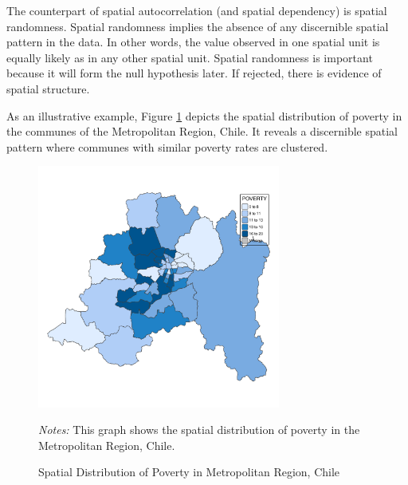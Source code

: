 \documentclass[english,12pt]{book}\usepackage[]{graphicx}\usepackage[]{xcolor}
\newenvironment{knitrout}{}{} %
\begin{document}
The counterpart of spatial autocorrelation (and spatial dependency) is spatial randomness. Spatial randomness implies the absence of any discernible spatial pattern in the data. In other words, the value observed in one spatial unit is equally likely as in any other spatial unit. Spatial randomness is important because it will form the null hypothesis later. If rejected, there is evidence of spatial structure.

As an illustrative example, Figure \ref{fig:MR} depicts the spatial distribution of poverty in the communes of the Metropolitan Region, Chile. It reveals a discernible spatial pattern where communes with similar poverty rates are clustered.
\begin{figure}[ht]
  \caption{Spatial Distribution of Poverty in Metropolitan Region, Chile}
    \label{fig:MR}
    \centering
    	\begin{minipage}{.9\linewidth}
\begin{knitrout}
\color{fgcolor}

{\centering \includegraphics[width=8cm,height=8cm]{figure/MetroRegion-1} 

}


\end{knitrout}
\footnotesize
		\emph{Notes:} This graph shows the spatial distribution of poverty in the Metropolitan Region, Chile. 
	\end{minipage}	
\end{figure}
\end{document}
